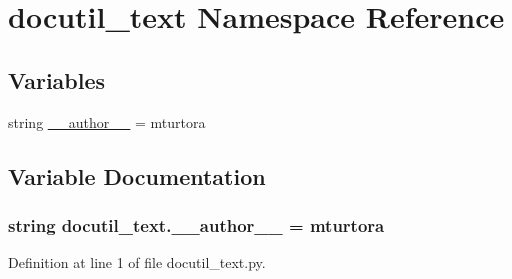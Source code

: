 \hypertarget{namespacedocutil__text}{}\section{docutil\+\_\+text Namespace Reference}
\label{namespacedocutil__text}
\subsection*{Variables}
\begin{DoxyCompactItemize}
\item 
string \hyperlink{namespacedocutil__text_a29c40c7a34ccbc2912a2de0125ac51fa}{\+\_\+\+\_\+author\+\_\+\+\_\+} = \textquotesingle{}mturtora\textquotesingle{}
\end{DoxyCompactItemize}


\subsection{Variable Documentation}
\hypertarget{namespacedocutil__text_a29c40c7a34ccbc2912a2de0125ac51fa}{}
\subsubsection[{\+\_\+\+\_\+author\+\_\+\+\_\+}]{\setlength{\rightskip}{0pt plus 5cm}string docutil\+\_\+text.\+\_\+\+\_\+author\+\_\+\+\_\+ = \textquotesingle{}mturtora\textquotesingle{}}\label{namespacedocutil__text_a29c40c7a34ccbc2912a2de0125ac51fa}


Definition at line 1 of file docutil\+\_\+text.\+py.

